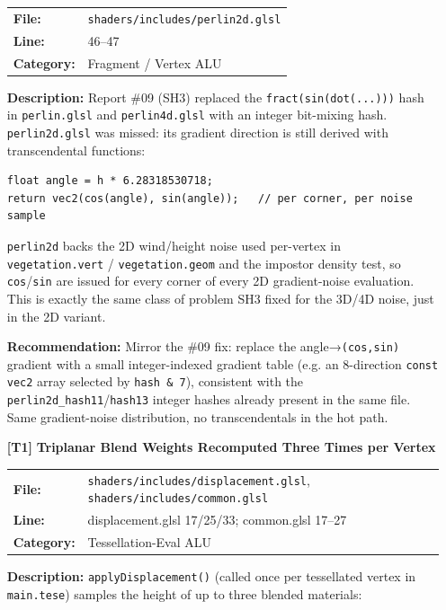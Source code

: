 \documentclass[a4paper,12pt]{article}
\newcommand{\severitybox}[2]{%
  \colorbox{#1}{\makebox[2.5cm][c]{\textcolor{white}{\textbf{#2}}}}%
}
\begin{document}
\begin{enumerate}[leftmargin=*]
  \begin{tabular}{ll}
    \textbf{File:} & \texttt{shaders/includes/perlin2d.glsl} \\
    \textbf{Line:} & 46--47 \\
    \textbf{Category:} & Fragment / Vertex ALU \\
  \end{tabular}

  \textbf{Description:}
  Report \#09 (SH3) replaced the \texttt{fract(sin(dot(...)))} hash in
  \texttt{perlin.glsl} and \texttt{perlin4d.glsl} with an integer bit-mixing
  hash. \texttt{perlin2d.glsl} was missed: its gradient direction is still
  derived with transcendental functions:

\begin{lstlisting}
float angle = h * 6.28318530718;
return vec2(cos(angle), sin(angle));   // per corner, per noise sample
\end{lstlisting}

  \texttt{perlin2d} backs the 2D wind/height noise used per-vertex in
  \texttt{vegetation.vert} / \texttt{vegetation.geom} and the impostor density
  test, so \texttt{cos}/\texttt{sin} are issued for every corner of every 2D
  gradient-noise evaluation. This is exactly the same class of problem SH3 fixed
  for the 3D/4D noise, just in the 2D variant.

  \textbf{Recommendation:}
  Mirror the \#09 fix: replace the angle→\texttt{(cos,sin)} gradient with a
  small integer-indexed gradient table (e.g. an 8-direction \texttt{const vec2}
  array selected by \texttt{hash \& 7}), consistent with the
  \texttt{perlin2d\_hash11}/\texttt{hash13} integer hashes already present in
  the same file. Same gradient-noise distribution, no transcendentals in the hot
  path.

\item[\textbf{[T1]}] \textbf{Triplanar Blend Weights Recomputed Three Times per Vertex}
  \hfill \severitybox{mediumcolor}{MEDIUM}

  \begin{tabular}{ll}
    \textbf{File:} & \texttt{shaders/includes/displacement.glsl}, \texttt{shaders/includes/common.glsl} \\
    \textbf{Line:} & displacement.glsl 17/25/33; common.glsl 17--27 \\
    \textbf{Category:} & Tessellation-Eval ALU \\
  \end{tabular}

  \textbf{Description:}
  \texttt{applyDisplacement()} (called once per tessellated vertex in
  \texttt{main.tese}) samples the height of up to three blended materials:


\end{enumerate}
\end{document}
